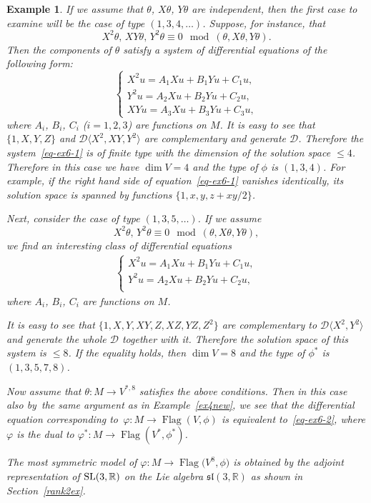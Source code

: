 \documentclass[pdftex]{sigma}%
\newcommand{\R}{\mathbb R}
\newcommand{\cD}{\mathcal D}
\newcommand{\Flag}{\operatorname{Flag}}
\newtheorem{ex}[thm]{Example}
\numberwithin{equation}{section}
\begin{document}
\begin{ex}
	If we assume that $\theta$, $X\theta$, $Y\theta$ are independent, then the first case to examine will be the case of type $(1,3,4,\dots)$. Suppose, for instance, that
	\[
		X^2\theta,\,XY\theta,\, Y^2\theta \equiv 0 \mod (\theta,X\theta,Y\theta).
	\]
	Then the components of $\theta$ satisfy a system of differential equations of the following form:
	\begin{equation}\label{eq-ex6-1}
	\begin{cases}
	X^2u = A_1 Xu+B_1 Yu + C_1u,\\
	Y^2u = A_2 Xu+B_2 Yu + C_2u,\\
	XYu = A_3 Xu+B_3 Yu + C_3u,
	\end{cases}
	\end{equation}
	where $A_i$, $B_i$, $C_i$ ($i=1,2,3$) are functions on $M$. It is easy to see that $\{1,X,Y,Z\}$ and $\cD\big\langle X^2,XY,Y^2\big\rangle$ are complementary and generate $\cD$. Therefore the system~\eqref{eq-ex6-1} is of finite type with the dimension of the solution space $\le 4$. Therefore in this case we have $\dim V=4$ and the type of $\phi$ is $(1,3,4)$. For example, if the right hand side of equation~\eqref{eq-ex6-1} vanishes identically, its solution space is spanned by functions $\{1,x,y,z+xy/2\}$.
	
{\samepage	Next, consider the case of type $(1,3,5,\dots)$. If we assume
	\[
		X^2\theta,\, Y^2\theta \equiv 0 \mod (\theta,X\theta,Y\theta),
	\]
 	we find an interesting class of differential equations
	\begin{gather}\label{eq-ex6-2}
	\begin{cases}
	X^2u = A_1 Xu+B_1 Yu + C_1u,\\
	Y^2u = A_2 Xu+B_2 Yu + C_2u,\\
	\end{cases}
	\end{gather}
	where $A_i$, $B_i$, $C_i$ are functions on $M$.

}
	
	It is easy to see that $\big\{1,X,Y,XY,Z,XZ,YZ,Z^2\big\}$ are complementary to $\cD\big\langle X^2,Y^2\big\rangle$ and generate the whole $\cD$ together with it. Therefore the solution space of this system is $\le 8$. If the equality holds, then $\dim V=8$ and the type of $\phi^*$ is $(1,3,5,7,8)$.
	
	Now assume that $\theta\colon M\to V^{*,8}$ satisfies the above conditions. Then in this case also by~the same argument as in Example~\ref{ex4new}, we see that the differential equation corresponding to~$\varphi\colon M\to \Flag(V,\phi)$ is equivalent to~\eqref{eq-ex6-2}, where $\varphi$ is the dual to $\varphi^*\colon M\to \Flag(V^*,\phi^*)$.
	
	The most symmetric model of $\varphi\colon M\to \Flag\big(V^8,\phi\big)$ is obtained by the adjoint representation of ${\rm SL}(3,\R)$ on the Lie algebra $\mathfrak{sl}(3,\R)$ as shown in Section~\ref{rank2ex}.
\end{ex}
\end{document}
